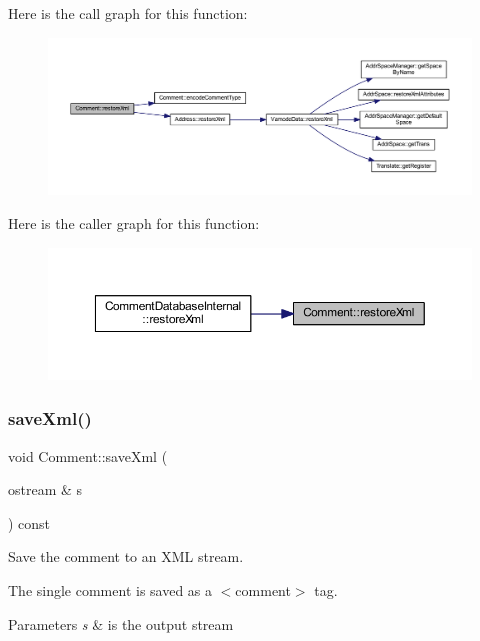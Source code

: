 Here is the call graph for this function\+:
\nopagebreak
\begin{figure}[H]
\begin{center}
\leavevmode
\includegraphics[width=350pt]{class_comment_a191cf541d9b91d88fba9c54c14f5c73d_cgraph}
\end{center}
\end{figure}
Here is the caller graph for this function\+:
\nopagebreak
\begin{figure}[H]
\begin{center}
\leavevmode
\includegraphics[width=350pt]{class_comment_a191cf541d9b91d88fba9c54c14f5c73d_icgraph}
\end{center}
\end{figure}
\mbox{\label{class_comment_af5f3045a6d056b6c00af6fc35c741b0a}} 
\subsubsection{\texorpdfstring{saveXml()}{saveXml()}}
{\footnotesize\ttfamily void Comment\+::save\+Xml (\begin{DoxyParamCaption}\item[{ostream \&}]{s }\end{DoxyParamCaption}) const}



Save the comment to an X\+ML stream. 

The single comment is saved as a $<$comment$>$ tag. 
\begin{DoxyParams}{Parameters}
{\em s} & is the output stream \\
\hline
\end{DoxyParams}


